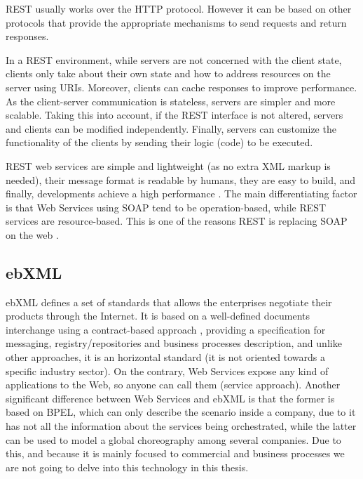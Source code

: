 REST usually works over the HTTP protocol. However it can be based on other protocols that provide the appropriate mechanisms to send requests and return responses.

In a REST environment, while servers are not concerned with the client state, clients only take about their own state and how to address resources on the server using URIs. Moreover, clients can cache responses to improve performance.
As the client-server communication is stateless, servers are simpler and more scalable. 
Taking this into account, if the REST interface is not altered, servers and clients can be modified independently.
Finally, servers can customize the functionality of the clients by sending their logic (code) to be executed.


REST web services are simple and lightweight (as no extra XML markup
is needed), their message format is readable by humans, they are easy
to build, and finally, developments achieve a high performance
\cite{Daigneau2011}. %
The main differentiating factor is that Web Services using SOAP tend to be operation-based, while REST services are resource-based. This is one of the reasons REST is replacing SOAP on the web \cite{Mason11REST}. %

\subsection{ebXML}
ebXML defines a set of standards that allows the enterprises negotiate their products through the Internet. It is based on a well-defined documents interchange using a contract-based approach \cite{Patil03ebxmlVsWS}, providing a specification for messaging, registry/repositories and business processes description, and unlike other approaches, it is an horizontal standard (it is not oriented towards a specific industry sector). On the contrary, Web Services expose any kind of applications to the Web, so anyone can call them (service approach). Another significant difference between Web Services and ebXML is that the former is based on BPEL, which can only describe the scenario inside a company, due to it has not all the information about the services being orchestrated, while the latter can be used to model a global choreography among several companies. Due to this, and because it is mainly focused to commercial and business processes we are not going to delve into this technology in this thesis.

